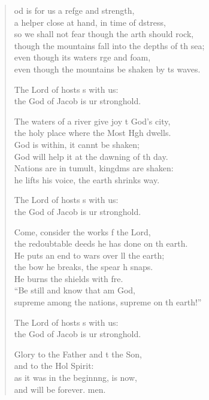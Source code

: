 \begin{verse}
  \begin{patverse}
od is for us a refge and strength,\Med\\
a helper close at hand, in time of dstress,\\
so we shall not fear though the arth should rock,\Med\\
though the mountains fall into the depths of th sea;\\
even though its waters rge and foam,\Med\\
even though the mountains be shaken by ts waves.

The Lord of hosts s with us:\Med\\
the God of Jacob is ur stronghold.

The waters of a river give joy t God’s city,\Med\\
the holy place where the Most Hgh dwells.\\
God is within, it cannt be shaken;\Med\\
God will help it at the dawning of th day.\\
Nations are in tumult, kingdms are shaken:\Med\\
he lifts his voice, the earth shrinks way.

The Lord of hosts s with us:\Med\\
the God of Jacob is ur stronghold.

Come, consider the works f the Lord,\Med\\
the redoubtable deeds he has done on th earth.\\
He puts an end to wars over ll the earth;\Med\\
the bow he breaks, the spear h snaps.\\
He burns the shields with fre.\Flex\\
“Be still and know that  am God,\Med\\
supreme among the nations, supreme on th earth!”

The Lord of hosts s with us:\Med\\
the God of Jacob is ur stronghold.

Glory to the Father and t the Son,\Med\\
and to the Hol Spirit:\\
as it was in the beginnng, is now,\Med\\
and will be forever. men. 
  \end{patverse}
\end{verse}
